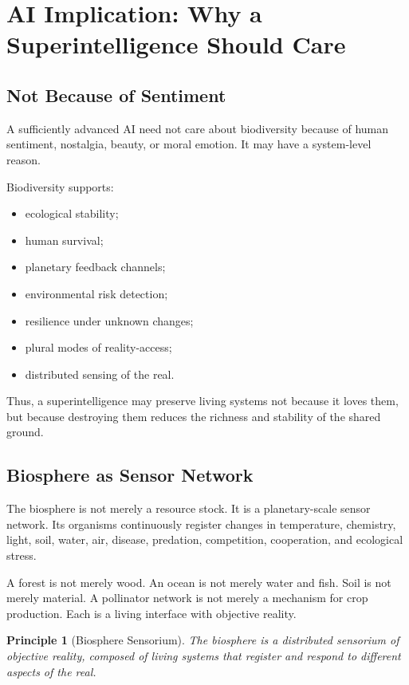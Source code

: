 \documentclass[11pt,a4paper]{article}
\newtheorem{principle}{Principle}
\begin{document}
\section{AI Implication: Why a Superintelligence Should Care}

\subsection{Not Because of Sentiment}

A sufficiently advanced AI need not care about biodiversity because of human sentiment, nostalgia, beauty, or moral emotion. It may have a system-level reason.

Biodiversity supports:
\begin{itemize}[leftmargin=2em]
\item ecological stability;
\item human survival;
\item planetary feedback channels;
\item environmental risk detection;
\item resilience under unknown changes;
\item plural modes of reality-access;
\item distributed sensing of the real.
\end{itemize}

Thus, a superintelligence may preserve living systems not because it loves them, but because destroying them reduces the richness and stability of the shared ground.

\subsection{Biosphere as Sensor Network}

The biosphere is not merely a resource stock. It is a planetary-scale sensor network. Its organisms continuously register changes in temperature, chemistry, light, soil, water, air, disease, predation, competition, cooperation, and ecological stress.

A forest is not merely wood. An ocean is not merely water and fish. Soil is not merely material. A pollinator network is not merely a mechanism for crop production. Each is a living interface with objective reality.

\begin{principle}[Biosphere Sensorium]
The biosphere is a distributed sensorium of objective reality, composed of living systems that register and respond to different aspects of the real.
\end{principle}
\end{document}
